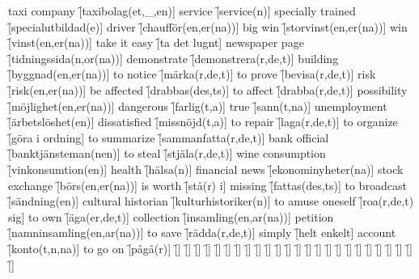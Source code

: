 \begin{questions}
\begin{multicols}{2}
        \question taxi company \f[taxibolag(et,\_,en)]
        \question service \f[service(n)]
        \question specially trained \f[specialutbildad(e)]
        \question driver \f[chaufför(en,er(na))]
        \question big win \f[storvinst(en,er(na))]
        \question win \f[vinst(en,er(na))]
        \question take it easy \f[ta det lugnt]
        \question newspaper page \f[tidningssida(n,or(na))]
        \question demonstrate \f[demonstrera(r,de,t)]
        \question building \f[byggnad(en,er(na))]
        \question to notice \f[märka(r,de,t)]
        \question to prove \f[bevisa(r,de,t)]
        \question risk \f[risk(en,er(na))]
        \question be affected \f[drabbas(des,ts)]
        \question to affect \f[drabba(r,de,t)]
        \question possibility \f[möjlighet(en,er(na))]
        \question dangerous \f[farlig(t,a)]
        \question true \f[sann(t,na)]
        \question unemployment \f[ärbetslöshet(en)]
        \question dissatisfied \f[missnöjd(t,a)]
        \question to repair \f[laga(r,de,t)]
        \question to organize \f[göra i ordning]
        \question to summarize \f[sammanfatta(r,de,t)]
        \question bank official \f[banktjänsteman(nen)]
        \question to steal \f[stjäla(r,de,t)]
        \question wine consumption \f[vinkonsumtion(en)]
        \question health \f[hälsa(n)]
        \question financial news \f[ekonominyheter(na)]
        \question stock exchange \f[börs(en,er(na))]
        \question is worth \f[stå(r) i]
        \question missing \f[fattas(des,ts)]
        \question to broadcast \f[sändning(en)]
        \question cultural historian \f[kulturhistoriker(n)]
        \question to amuse oneself \f[roa(r,de,t) sig]
        \question to own \f[äga(er,de,t)]
        \question collection \f[insamling(en,ar(na))]
        \question petition \f[namninsamling(en,ar(na))]
        \question to save \f[rädda(r,de,t)]
        \question simply \f[helt enkelt]
        \question account \f[konto(t,n,na)]
        \question to go on \f[pågå(r)]
        \question  \f[]
        \question  \f[]
        \question  \f[]
        \question  \f[]
        \question  \f[]
        \question  \f[]
        \question  \f[]
        \question  \f[]
        \question  \f[]
        \question  \f[]
        \question  \f[]
        \question  \f[]
        \question  \f[]
        \question  \f[]
        \question  \f[]
        \question  \f[]
        \question  \f[]
        \question  \f[]
        \question  \f[]
        \question  \f[]
        \question  \f[]
        \question  \f[]
        \question  \f[]
        \question  \f[]
        \question  \f[]

\end{multicols}
\end{questions}
